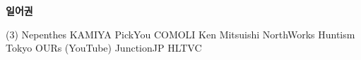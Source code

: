 \documentclass[a4paper,10pt]{extarticle}
\begin{document}
\noindent
{\textbf{일어권}}
\begin{tasks}[style=itemize](3)
	\task Nepenthes
	\task KAMIYA
	\task PickYou
	\task COMOLI
	\task Ken Mitsuishi
	\task NorthWorks
	\task Huntism Tokyo
	\task OURs (YouTube)
	\task JunctionJP
	\task HLTVC
\end{tasks}


\end{document}
